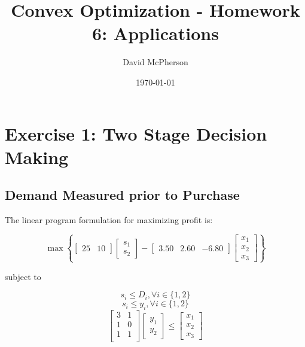 \documentclass[a4paper]{article}
\title{Convex Optimization - Homework 6: Applications}
\author{David McPherson}
\date{\today}
\begin{document}
\maketitle

\section{Exercise 1: Two Stage Decision Making}
\subsection{Demand Measured prior to Purchase}

The linear program formulation for maximizing profit is:

\begin{equation}
\max \left \{ [\begin{matrix}25 & 10\end{matrix}]\left [\begin{matrix}s_1 \\ s_2 \end{matrix} \right ]
-[\begin{matrix}3.50 & 2.60 & -6.80\end{matrix}] \left [\begin{matrix}x_1 \\ x_2 \\ x_3 \end{matrix} \right ]
\right \}
\end{equation}

subject to

\begin{equation}
s_i \leq D_i , \forall i \in \{1,2\}
\end{equation}
\begin{equation}
s_i \leq y_i , \forall i \in \{1,2\}
\end{equation}
\begin{equation}
\left[
\begin{matrix}
3 & 1 \\
1 & 0 \\
1 & 1 \\
\end{matrix}
\right]
\left[\begin{matrix}y_1 \\ y_2\end{matrix}\right]
\leq
\left[\begin{matrix}x_1 \\ x_2 \\ x_3 \end{matrix}\right]
\end{equation}
\end{document}
